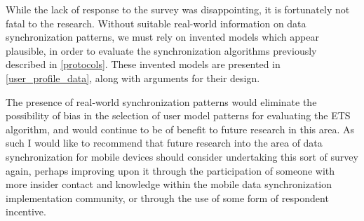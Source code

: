 While the lack of response to the survey was disappointing, it is fortunately not fatal to the research.  Without suitable real-world information on data synchronization patterns, we must rely on invented models which appear plausible, in order to evaluate the synchronization algorithms previously described in \ref{protocols}.  These invented models are presented in \ref{user_profile_data}, along with arguments for their design.

The presence of real-world synchronization patterns would eliminate the possibility of bias in the selection of user model patterns for evaluating the ETS algorithm, and would continue to be of benefit to future research in this area. As such I would like to recommend that future research into the area of data synchronization for mobile devices should consider undertaking this sort of survey again, perhaps improving upon it through the participation of someone with more insider contact and knowledge within the mobile data synchronization implementation community, or through the use of some form of respondent incentive.
